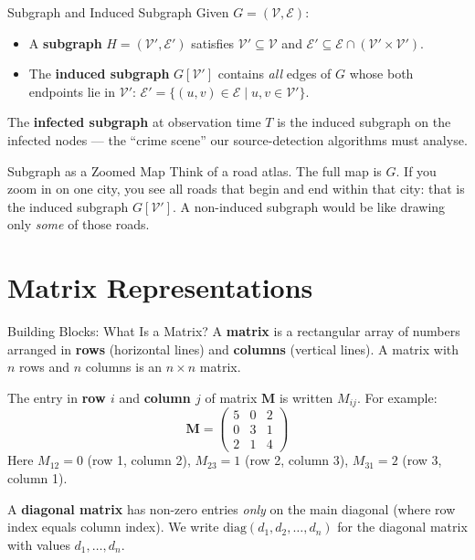 \begin{conceptbox}{Subgraph and Induced Subgraph}
Given $G = (\mathcal{V}, \mathcal{E})$:
\begin{itemize}[noitemsep]
    \item A \textbf{subgraph} $H = (\mathcal{V}', \mathcal{E}')$ satisfies $\mathcal{V}' \subseteq \mathcal{V}$ and $\mathcal{E}' \subseteq \mathcal{E} \cap (\mathcal{V}' \times \mathcal{V}')$.
    \item The \textbf{induced subgraph} $G[\mathcal{V}']$ contains \emph{all} edges of $G$ whose both endpoints lie in $\mathcal{V}'$: $\mathcal{E}' = \{(u,v) \in \mathcal{E} \mid u,v \in \mathcal{V}'\}$.
\end{itemize}
The \textbf{infected subgraph} at observation time $T$ is the induced subgraph on the infected nodes --- the ``crime scene'' our source-detection algorithms must analyse.
\end{conceptbox}

\begin{analogybox}{Subgraph as a Zoomed Map}
Think of a road atlas. The full map is $G$. If you zoom in on one city, you see all roads that begin and end within that city: that is the induced subgraph $G[\mathcal{V}']$. A non-induced subgraph would be like drawing only \emph{some} of those roads.
\end{analogybox}

\section{Matrix Representations}
\label{sec:matrix_representations}

\begin{conceptbox}{Building Blocks: What Is a Matrix?}
A \textbf{matrix} is a rectangular array of numbers arranged in \textbf{rows} (horizontal lines) and \textbf{columns} (vertical lines). A matrix with $n$ rows and $n$ columns is an $n \times n$ matrix.

The entry in \textbf{row $i$} and \textbf{column $j$} of matrix $\mathbf{M}$ is written $M_{ij}$. For example:
\[
\mathbf{M} = \begin{pmatrix} 5 & 0 & 2 \\ 0 & 3 & 1 \\ 2 & 1 & 4 \end{pmatrix}
\]
Here $M_{12} = 0$ (row 1, column 2), $M_{23} = 1$ (row 2, column 3), $M_{31} = 2$ (row 3, column 1).

A \textbf{diagonal matrix} has non-zero entries \emph{only} on the main diagonal (where row index equals column index). We write $\mathrm{diag}(d_1, d_2, \ldots, d_n)$ for the diagonal matrix with values $d_1, \ldots, d_n$.
\end{conceptbox}

